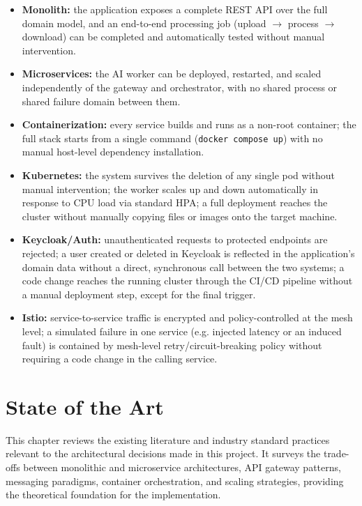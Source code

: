 \documentclass[twoside]{supsistudent}
\begin{document}
\begin{itemize}
    \item \textbf{Monolith:} the application exposes a complete REST API over the full domain model, and an end-to-end processing job (upload $\rightarrow$ process $\rightarrow$ download) can be completed and automatically tested without manual intervention.
    \item \textbf{Microservices:} the AI worker can be deployed, restarted, and scaled independently of the gateway and orchestrator, with no shared process or shared failure domain between them.
    \item \textbf{Containerization:} every service builds and runs as a non-root container; the full stack starts from a single command (\texttt{docker compose up}) with no manual host-level dependency installation.
    \item \textbf{Kubernetes:} the system survives the deletion of any single pod without manual intervention; the worker scales up and down automatically in response to CPU load via standard HPA; a full deployment reaches the cluster without manually copying files or images onto the target machine.
    \item \textbf{Keycloak/Auth:} unauthenticated requests to protected endpoints are rejected; a user created or deleted in Keycloak is reflected in the application's domain data without a direct, synchronous call between the two systems; a code change reaches the running cluster through the CI/CD pipeline without a manual deployment step, except for the final trigger.
    \item \textbf{Istio:} service-to-service traffic is encrypted and policy-controlled at the mesh level; a simulated failure in one service (e.g. injected latency or an induced fault) is contained by mesh-level retry/circuit-breaking policy without requiring a code change in the calling service.
\end{itemize}

\chapter{State of the Art}
This chapter reviews the existing literature and industry standard practices relevant to the architectural decisions made in this project. It surveys the trade-offs between monolithic and microservice architectures, API gateway patterns, messaging paradigms, container orchestration, and scaling strategies, providing the theoretical foundation for the implementation.
\end{document}
